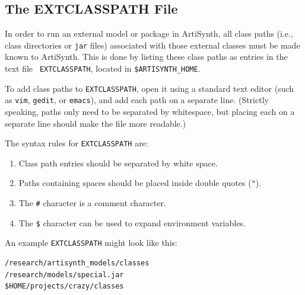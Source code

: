 \documentclass{article}
\def\directories{directories }
\begin{document}
\subsection{The EXTCLASSPATH File}
\label{EXTCLASSPATHFile}

In order to run an external model or package in ArtiSynth, all class
paths (i.e., class \directories or {\tt jar} files) associated with
those external classes must be made known to ArtiSynth. This is done
by listing these class paths as entries in the text file {\tt
EXTCLASSPATH}, located in {\tt \$ARTISYNTH\_HOME}.

To add class paths to {\tt EXTCLASSPATH}, open it using a standard
text editor (such as {\tt vim}, {\tt gedit}, or {\tt emacs}), and add
each path on a separate line. (Strictly speaking, paths only need to
be separated by whitespace, but placing each on a separate line should
make the file more readable.)

The syntax rules for {\tt EXTCLASSPATH} are:

\begin{enumerate}

\item Class path entries should be separated by white space.

\item Paths containing spaces should be placed inside double quotes
({\tt "}).

\item The {\tt \#} character is a comment character.

\item The {\tt \$} character can be used to expand environment variables.

\end{enumerate}

An example {\tt EXTCLASSPATH} might look like this:

\begin{verbatim}
/research/artisynth_models/classes
/research/models/special.jar
$HOME/projects/crazy/classes
\end{verbatim}
\end{document}
